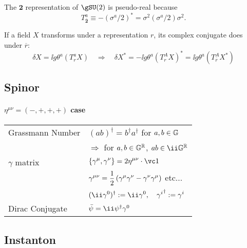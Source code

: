 The $\boldsymbol2$ representation of $\gSU(2)$ is pseudo-real because
\begin{equation}
 T_{\overline {{\boldsymbol 2}}}^a \equiv -(\sigma^a/2)^* = \sigma^2(\sigma^a/2)\sigma^2.
\end{equation}

If a field $X$ transforms under a representation $r$, its complex conjugate does under $\overline r$:
\begin{equation}
  \delta X=\ii g\theta^a(T_r^a X)
\quad\Longrightarrow\quad
 \delta X^*
=-\ii g\theta^a(T_r^A X)^*
=\ii g\theta^a(T_{\overline r}^AX^*)
\end{equation}

\newpage







\subsection{Spinor}
\paragraph{$\eta^{\mu\nu}=(-,+,+,+)$ case}
\begin{tabular}[t]{l@{\ :\ }l}
 Grassmann Number
& $(ab)^\dagger=b^\dagger a^\dagger$ for $a,b\in\mathbb G$\\
& $\Longrightarrow$ for $a,b\in\mathbb G^\mathbb R$, $ab\in\ii\RealGrassmann$\\
 $\gamma$ matrix
& $\displaystyle\{\Gm,\Gn\}=2\minkow\mu\nu\cdot\vc1$\\
& $\displaystyle\G{\mu\nu} = \frac12\left(\Gm\Gn-\Gn\Gm\right)$
  \quad etc...\\
& $\displaystyle(\ii\G0)^\dagger:=\ii\G0,\quad\G i^\dagger:=\G i$\\
 Dirac Conjugate
& $\bar\psi=\ii\psi^\dagger\G0$
\end{tabular}

\subsection{Instanton}
\label{sec:cs-instanton}





